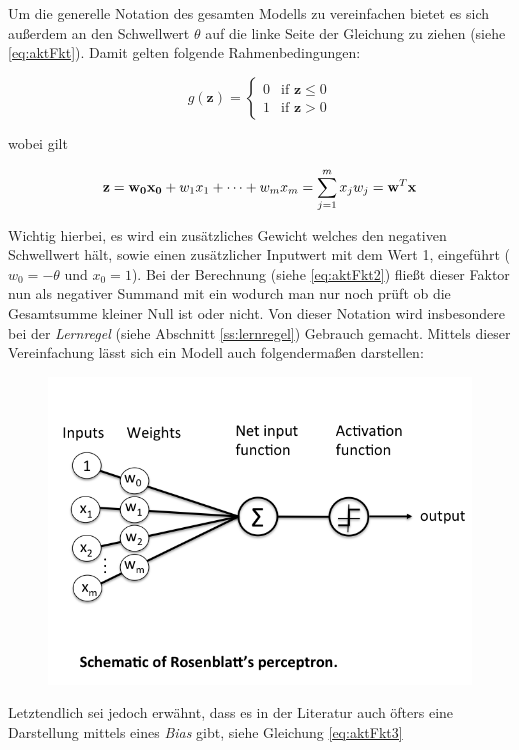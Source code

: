 Um die generelle Notation des gesamten Modells zu vereinfachen bietet es sich außerdem an den Schwellwert $\theta$ auf die linke Seite der Gleichung zu ziehen (siehe \ref{eq:aktFkt}). Damit gelten folgende Rahmenbedingungen: 

\begin{equation} \label{eq:aktFkt2}
g(\mathbf{z}) =\begin{cases}
	0 & \mbox{if } \mathbf{z} \leq 0 \\
    1 & \mbox{if } \mathbf{z} > 0
  \end{cases}
\end{equation}

wobei gilt

\begin{equation} \label{eq:vektorprod}
\mathbf{z} =  \mathbf{w_0x_{0}} + w_1x_{1} + \dots + w_mx_{m} = \sum_{j=1}^{m} x_{j}w_{j} \\ = \mathbf{w}^T\mathbf{x}
\end{equation}

\label{w0Erklaerung}
Wichtig hierbei, es wird ein zusätzliches Gewicht welches den negativen Schwellwert hält, sowie einen zusätzlicher Inputwert mit dem Wert 1, eingeführt ($w_0 = -\theta  \text{ und } x_0=1$). Bei der Berechnung (siehe \autoref{eq:aktFkt2}) fließt dieser Faktor nun als negativer Summand mit ein wodurch man nur noch prüft ob die Gesamtsumme kleiner Null ist oder nicht. Von dieser Notation wird insbesondere bei der \emph{Lernregel} (siehe Abschnitt \ref{ss:lernregel}) Gebrauch gemacht. Mittels dieser Vereinfachung lässt sich ein Modell auch folgendermaßen darstellen: 

\begin{figure}[!htb]
	\centering
	\includegraphics[width=.6\linewidth]{img/perceptron_schematisch}
	\label{fig:perc_modelansicht}
\end{figure}

Letztendlich sei jedoch erwähnt, dass es in der Literatur auch öfters eine Darstellung mittels eines \emph{Bias} gibt, siehe Gleichung \autoref{eq:aktFkt3} \cite{dlnielsen}

